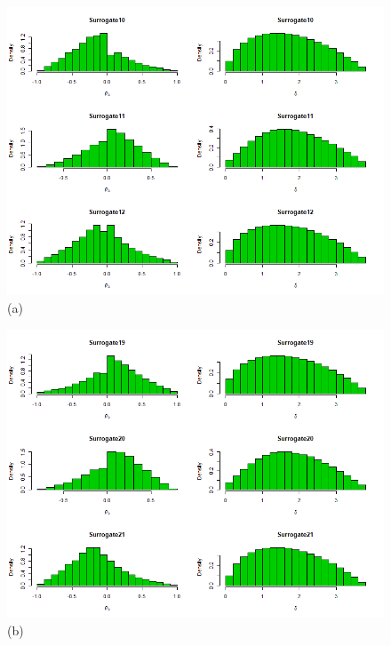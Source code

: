 \documentclass[a4paper,12pt]{article}
\begin{document}
	\begin{figure}[H]
		\centering
		\begin{minipage}{0.45\textwidth}
			\includegraphics[scale=0.35]{icaplots4.png}\\(a)
		\end{minipage} 
		\begin{minipage}{0.45\textwidth}
			\includegraphics[scale=0.35]{icaplots7.png}\\(b)
		\end{minipage} 
	\end{figure}
	
\end{document}
